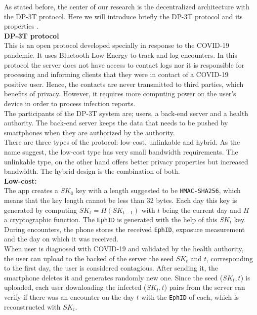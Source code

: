 \documentclass[a4paper, twocolumn]{article}
\begin{document}
\noindent As stated before, the center of our research is the decentralized architecture with the DP-3T protocol. Here we will introduce briefly the DP-3T protocol and its properties \cite{dp3t-white}\cite{dp3t}. \\

\noindent \textbf{DP-3T protocol}\\
This is an open protocol developed specially in response to the COVID-19 pandemic. It uses Bluetooth Low Energy to track and log encounters. In this protocol the server does not have access to contact logs nor it is responsible for processing and informing clients that they were in contact of a COVID-19 positive user. Hence, the contacts are never transmitted to third parties, which benefits of privacy. However, it requires more computing power on the user's device in order to process infection reports.\\
The participants of the DP-3T system are; users, a back-end server and a health authority. The back-end server keeps the data that needs to be pushed by smartphones when they are authorized by the authority.\\
There are three types of the protocol: low-cost, unlinkable and hybrid. As the name suggest, the low-cost type has very small bandwidth requirements. The unlinkable type, on the other hand offers better privacy properties but increased bandwidth. The hybrid design is the combination of both.\\
\textbf{Low-cost:}\\
The app creates a \texttt{$SK_0$} key with a length suggested to be \texttt{HMAC-SHA256}, which means that the key length cannot be less than 32 bytes. Each day this key is generated by computing \texttt{$SK_t = H(SK_{t-1})$} with $t$ being the current day and $H$ a cryptographic function. The \texttt{EphID} is generated with the help of this \texttt{$SK_t$} key.\\
During encounters, the phone stores the received \texttt{EphID}, exposure measurement and the day on which it was received.\\
When user is diagnosed with COVID-19 and validated by the health authority, the user can upload to the backed of the server the seed \texttt{$SK_t$} and $t$, corresponding to the first day, the user is considered contagious. After sending it, the smartphone deletes it and generates randomly new one. Since the seed (\texttt{$SK_t,t$}) is uploaded, each user downloading the infected (\texttt{$SK_t,t$}) pairs from the server can verify if there was an encounter on the day $t$ with the \texttt{EphID} of each, which is reconstructed with \texttt{$SK_t$}.\\
\end{document}
